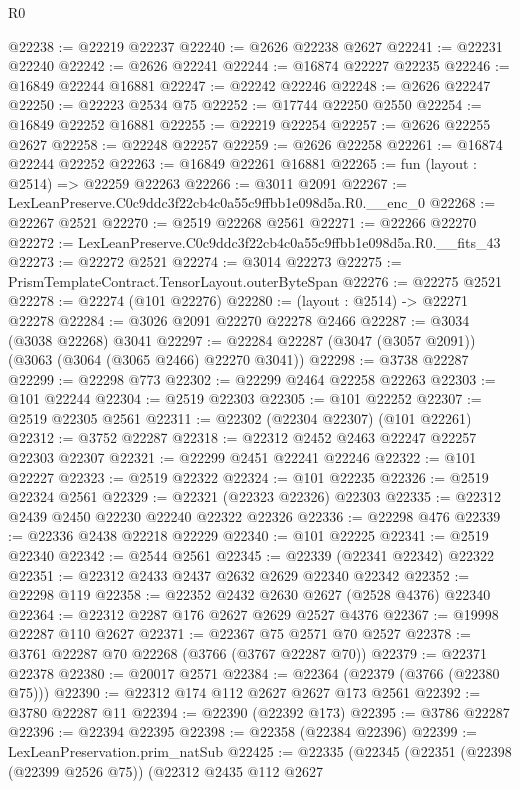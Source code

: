 \begin{lexlean}{R0}
\begin{coremodule}
@22238 := @22219 @22237
@22240 := @2626 @22238 @2627
@22241 := @22231 @22240
@22242 := @2626 @22241
@22244 := @16874 @22227 @22235
@22246 := @16849 @22244 @16881
@22247 := @22242 @22246
@22248 := @2626 @22247
@22250 := @22223 @2534 @75
@22252 := @17744 @22250 @2550
@22254 := @16849 @22252 @16881
@22255 := @22219 @22254
@22257 := @2626 @22255 @2627
@22258 := @22248 @22257
@22259 := @2626 @22258
@22261 := @16874 @22244 @22252
@22263 := @16849 @22261 @16881
@22265 := fun (layout : @2514) => @22259 @22263
@22266 := @3011 @2091
@22267 := LexLeanPreserve.C0c9ddc3f22cb4c0a55c9ffbb1e098d5a.R0.__enc_0
@22268 := @22267 @2521
@22270 := @2519 @22268 @2561
@22271 := @22266 @22270
@22272 := LexLeanPreserve.C0c9ddc3f22cb4c0a55c9ffbb1e098d5a.R0.__fits_43
@22273 := @22272 @2521
@22274 := @3014 @22273
@22275 := PrismTemplateContract.TensorLayout.outerByteSpan
@22276 := @22275 @2521
@22278 := @22274 (@101 @22276)
@22280 := (layout : @2514) -> @22271 @22278
@22284 := @3026 @2091 @22270 @22278 @2466
@22287 := @3034 (@3038 @22268) @3041
@22297 := @22284 @22287 (@3047 (@3057 @2091)) (@3063 (@3064 (@3065 @2466) @22270 @3041))
@22298 := @3738 @22287
@22299 := @22298 @773
@22302 := @22299 @2464 @22258 @22263
@22303 := @101 @22244
@22304 := @2519 @22303
@22305 := @101 @22252
@22307 := @2519 @22305 @2561
@22311 := @22302 (@22304 @22307) (@101 @22261)
@22312 := @3752 @22287
@22318 := @22312 @2452 @2463 @22247 @22257 @22303 @22307
@22321 := @22299 @2451 @22241 @22246
@22322 := @101 @22227
@22323 := @2519 @22322
@22324 := @101 @22235
@22326 := @2519 @22324 @2561
@22329 := @22321 (@22323 @22326) @22303
@22335 := @22312 @2439 @2450 @22230 @22240 @22322 @22326
@22336 := @22298 @476
@22339 := @22336 @2438 @22218 @22229
@22340 := @101 @22225
@22341 := @2519 @22340
@22342 := @2544 @2561
@22345 := @22339 (@22341 @22342) @22322
@22351 := @22312 @2433 @2437 @2632 @2629 @22340 @22342
@22352 := @22298 @119
@22358 := @22352 @2432 @2630 @2627 (@2528 @4376) @22340
@22364 := @22312 @2287 @176 @2627 @2629 @2527 @4376
@22367 := @19998 @22287 @110 @2627
@22371 := @22367 @75 @2571 @70 @2527
@22378 := @3761 @22287 @70 @22268 (@3766 (@3767 @22287 @70))
@22379 := @22371 @22378
@22380 := @20017 @2571
@22384 := @22364 (@22379 (@3766 (@22380 @75)))
@22390 := @22312 @174 @112 @2627 @2627 @173 @2561
@22392 := @3780 @22287 @11
@22394 := @22390 (@22392 @173)
@22395 := @3786 @22287
@22396 := @22394 @22395
@22398 := @22358 (@22384 @22396)
@22399 := LexLeanPreservation.prim_natSub
@22425 := @22335
    (@22345
      (@22351
        (@22398 (@22399 @2526 @75))
        (@22312
          @2435
          @112
          @2627

\end{coremodule}
\end{lexlean}
